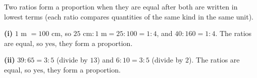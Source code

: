 Two ratios form a proportion when they are equal after both are written in lowest terms (each ratio compares quantities of the same kind in the same unit).

\textbf{(i)} $1$ m $=100$ cm, so $25\text{ cm}:1\text{ m}=25:100=1:4$, and $40:160=1:4$. The ratios are equal, so $\boxed{\text{yes}}$, they form a proportion.

\textbf{(ii)} $39:65=3:5$ (divide by $13$) and $6:10=3:5$ (divide by $2$). The ratios are equal, so $\boxed{\text{yes}}$, they form a proportion.
